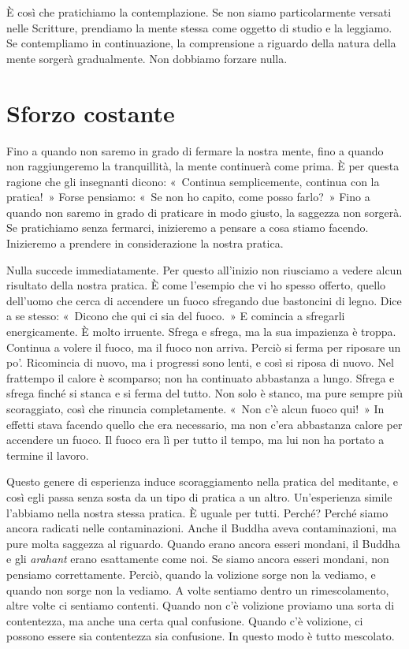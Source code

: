 È così che pratichiamo la contemplazione. Se non siamo particolarmente
versati nelle Scritture, prendiamo la mente stessa come oggetto di
studio e la leggiamo. Se contempliamo in continuazione, la comprensione
a riguardo della natura della mente sorgerà gradualmente. Non dobbiamo
forzare nulla.

\section{Sforzo costante}

Fino a quando non saremo in grado di fermare la nostra mente, fino a
quando non raggiungeremo la tranquillità, la mente continuerà come
prima. È per questa ragione che gli insegnanti dicono: «~Continua
semplicemente, continua con la pratica!~» Forse pensiamo: «~Se non ho
capito, come posso farlo?~» Fino a quando non saremo in grado di
praticare in modo giusto, la saggezza non sorgerà. Se pratichiamo senza
fermarci, inizieremo a pensare a cosa stiamo facendo. Inizieremo a
prendere in considerazione la nostra pratica.

Nulla succede immediatamente. Per questo all'inizio non riusciamo a
vedere alcun risultato della nostra pratica. È come l'esempio che vi ho
spesso offerto, quello dell'uomo che cerca di accendere un fuoco
sfregando due bastoncini di legno. Dice a se stesso: «~Dicono che qui ci
sia del fuoco.~» E comincia a sfregarli energicamente. È molto irruente.
Sfrega e sfrega, ma la sua impazienza è troppa. Continua a volere il
fuoco, ma il fuoco non arriva. Perciò si ferma per riposare un po'.
Ricomincia di nuovo, ma i progressi sono lenti, e così si riposa di
nuovo. Nel frattempo il calore è scomparso; non ha continuato abbastanza
a lungo. Sfrega e sfrega finché si stanca e si ferma del tutto. Non solo
è stanco, ma pure sempre più scoraggiato, così che rinuncia
completamente. «~Non c'è alcun fuoco qui!~» In effetti stava facendo
quello che era necessario, ma non c'era abbastanza calore per accendere
un fuoco. Il fuoco era lì per tutto il tempo, ma lui non ha portato a
termine il lavoro.

Questo genere di esperienza induce scoraggiamento nella pratica del
meditante, e così egli passa senza sosta da un tipo di pratica a un
altro. Un'esperienza simile l'abbiamo nella nostra stessa pratica. È
uguale per tutti. Perché? Perché siamo ancora radicati nelle
contaminazioni. Anche il Buddha aveva contaminazioni, ma pure molta
saggezza al riguardo. Quando erano ancora esseri mondani, il Buddha e
gli \emph{arahant} erano esattamente come noi. Se siamo ancora esseri
mondani, non pensiamo correttamente. Perciò, quando la volizione sorge
non la vediamo, e quando non sorge non la vediamo. A volte sentiamo
dentro un rimescolamento, altre volte ci sentiamo contenti. Quando non
c'è volizione proviamo una sorta di contentezza, ma anche una certa qual
confusione. Quando c'è volizione, ci possono essere sia contentezza sia
confusione. In questo modo è tutto mescolato.

